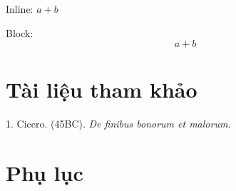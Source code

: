 \documentclass[14pt,oneside]{scrbook}
\newlength{\cslhangindent}
\newenvironment{CSLReferences}[2] %
{\begin{list}{}{%
\setlength{\itemindent}{\smallskipamount}
\setlength{\leftmargin}{0pt}
\setlength{\parsep}{\smallskipamount}
\ifodd #1
\setlength{\leftmargin}{\cslhangindent}
\setlength{\itemindent}{-1\cslhangindent}
\fi
\setlength{\itemsep}{#2\baselineskip}}}
{\end{list}}
\begin{document}
Inline: \(a+b\)

Block: \[a+b\]

\chapter{Tài liệu tham khảo}\label{tuxe0i-liux1ec7u-tham-khux1ea3o}

\label{refs}
\begin{CSLReferences}{1}{0}
1. Cicero. (45BC). \emph{De finibus bonorum et malorum}.

\end{CSLReferences}

\chapter{Phụ lục}\label{phux1ee5-lux1ee5c}
\backmatter
\end{document}
